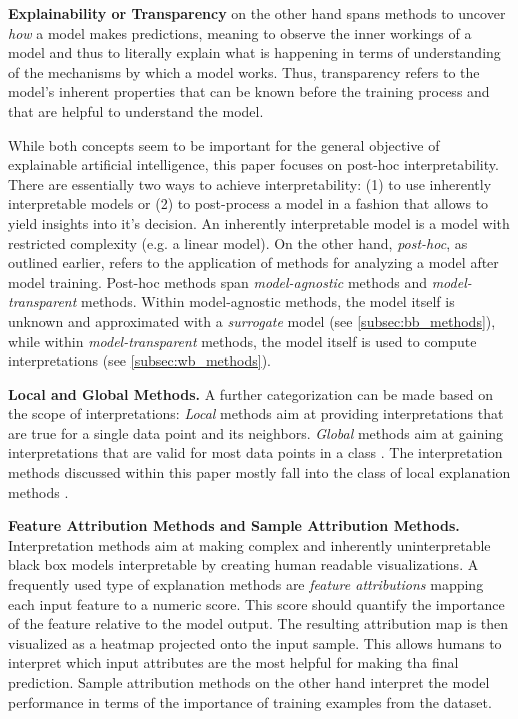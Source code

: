 \documentclass[sigconf]{acmart}
\newcommand{\mypar}[1]{\vspace{0.2cm}\noindent\textbf{#1}}
\begin{document}
\mypar{Explainability or Transparency} on the other hand spans methods to uncover \textit{how} a model makes predictions, meaning to observe the inner workings of a model and thus to literally explain what is happening in terms of understanding of the mechanisms by which a model works. Thus, transparency refers to the model's inherent properties that can be known before the training process and that are helpful to understand the model.

\par\smallskip\vspace*{-0.1cm}
While both concepts seem to be important for the general objective of explainable artificial intelligence, this paper focuses on post-hoc interpretability.
There are essentially two ways to achieve interpretability: (1) to use inherently interpretable models or (2) to post-process a model in a fashion that allows to yield insights into it's decision. 
An inherently interpretable model is a model with restricted complexity (e.g. a linear model). On the other hand, \textit{post-hoc}, as outlined earlier, refers to the application of methods for analyzing a model after model training.
Post-hoc methods span \textit{model-agnostic} methods and \textit{model-transparent} methods. Within model-agnostic methods, the model itself is unknown and approximated with a \textit{surrogate} model (see \autoref{subsec:bb_methods}), while within \textit{model-transparent} methods, the model itself is used to compute interpretations (see \autoref{subsec:wb_methods}). 

\mypar{Local and Global Methods.} A further categorization can be made based on the scope of interpretations: \textit{Local} methods aim at providing interpretations that are true for a single data point and its neighbors. 
\textit{Global} methods aim at gaining interpretations that are valid for most data points in a class \cite{kim2018interpretability, nguyen2017plug, yosinski2015understanding}. The interpretation methods discussed within this paper mostly fall into the class of local explanation methods \cite{ribeiro2016should, lundberg2017unified, bach2015pixel}.

\mypar{Feature Attribution Methods and Sample Attribution Methods. } Interpretation methods aim at making complex and inherently uninterpretable black box models interpretable by creating human readable visualizations. 
A frequently used type of explanation methods are \textit{feature attributions} mapping each input feature to a numeric score. This score should quantify the importance of the feature relative to the model output. The resulting attribution map is then visualized as a heatmap projected onto the input sample. This allows humans to interpret which input attributes are the most helpful for making tha final prediction. Sample attribution methods on the other hand interpret the model performance in terms of the importance of training examples from the dataset. 
\end{document}
